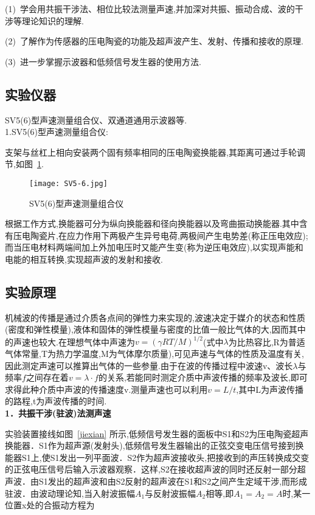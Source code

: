 \documentclass[12pt,a4paper,oneside,UTF8]{ctexart}
\begin{document}
(1)~学会用共振干涉法、相位比较法测量声速,并加深对共振、振动合成、波的干涉等理论知识的理解.

(2)~了解作为传感器的压电陶瓷的功能及超声波产生、发射、传播和接收的原理.

(3)~进一步掌握示波器和低频信号发生器的使用方法.

\subsection{实验仪器}

SV5(6)型声速测量组合仪、双通道通用示波器等.\\

1.SV5(6)型声速测量组合仪: 

支架与丝杠上相向安装两个固有频率相同的压电陶瓷换能器,其距离可通过手轮调节,如图~\ref{SV5}.

\begin{figure}[htpb]
	\centering
	\texttt{[image: SV5-6.jpg]}
	\caption{SV5(6)型声速测量组合仪}
	\label{SV5}
\end{figure}

根据工作方式,换能器可分为纵向换能器和径向换能器以及弯曲振动换能器.其中含有压电陶瓷片,在应力作用下两极产生异号电荷,两极间产生电势差(称正压电效应);而当压电材料两端间加上外加电压时又能产生变(称为逆压电效应),以实现声能和电能的相互转换,实现超声波的发射和接收.

\subsection{实验原理}

机械波的传播是通过介质各点间的弹性力来实现的,波速决定于媒介的状态和性质(密度和弹性模量),液体和固体的弹性模量与密度的比值一般比气体的大,因而其中的声速也较大.在理想气体中声速为$ v=(\gamma RT/M)^{1/2}$(式中$\lambda$为比热容比,R为普适气体常量,T为热力学温度,M为气体摩尔质量),可见声速与气体的性质及温度有关,因此测定声速可以推算出气体的一些参量.由于在波的传播过程中波速v、波长$\lambda$与频率$f$之间存在着$v=\lambda \cdot f$的关系,若能同时测定介质中声波传播的频率及波长,即可求得此种介质中声波的传播速度v.测量声速也可以利用$v=L/t$,其中L为声波传播的路程,t为声波传播的时间.\\

\textbf{1．共振干涉(驻波)法测声速}

实验装置接线如图~\ref{jiexian} 所示,低频信号发生器的面板中S1和S2为压电陶瓷超声换能器．S1作为超声源(发射头),低频信号发生器输出的正弦交变电压信号接到换能器S1上,使S1发出一列平面波．S2作为超声波接收头,把接收到的声压转换成交变的正弦电压信号后输入示波器观察．这样,S2在接收超声波的同时还反射一部分超声波．由S1发出的超声波和由S2反射的超声波在S1和S2之间产生定域干涉,而形成驻波．由波动理论知,当入射波振幅$A_1$与反射波振幅$A_2$相等,即$A_1=A_2=A$时,某一位置x处的合振动方程为
\end{document}

